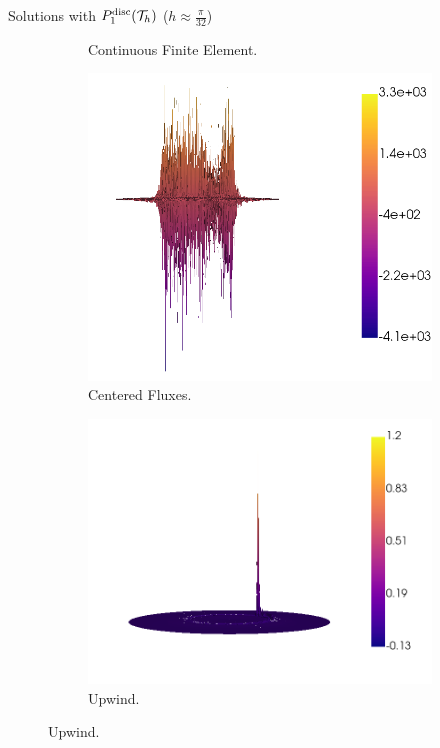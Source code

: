 \begin{frame}{Solutions with $\relax{P}^{\text{disc}}_1(\mathcal{T}_h)$ ($h\approx\frac{\pi}{32}$)}
\begin{figure}[h!]
\begin{subfigure}[b]{0.49\textwidth}
						\caption{Continuous Finite Element.}
					\end{subfigure}
					\begin{subfigure}[b]{0.49\textwidth}
						\centering
						\includegraphics[scale=0.16]{img/Conveccion_Reaccion/strong/conv_react_u_CF_nx-64.png}
						\caption{Centered Fluxes.}
					\end{subfigure}
					\begin{subfigure}[b]{0.49\textwidth}
						\centering
						\includegraphics[scale=0.16]{img/Conveccion_Reaccion/strong/conv_react_u_UPW_nx-64.png}
						\caption{Upwind.}
					\end{subfigure}
				\end{figure}
			\end{frame}
